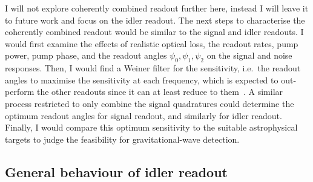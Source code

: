 I will not explore coherently combined readout further here, instead I will leave it to future work and focus on the idler readout. The next steps to characterise the coherently combined readout would be similar to the signal and idler readouts. I would first examine the effects of realistic optical loss, the readout rates, pump power, pump phase, and the readout angles $\psi_0,\psi_1,\psi_2$ on the signal and noise responses. %
Then, I would find a Weiner filter for the sensitivity, i.e.\ the readout angles to maximise the sensitivity at each frequency, which is expected to out-perform the other readouts since it can at least reduce to them~\cite{}. A similar process restricted to only combine the signal quadratures could determine the optimum readout angles for signal readout, and similarly for idler readout. Finally, I would compare this optimum sensitivity to the suitable astrophysical targets to judge the feasibility for gravitational-wave detection.


\subsection{General behaviour of idler readout}
\label{sec:nIS_general_behaviour_idler}

